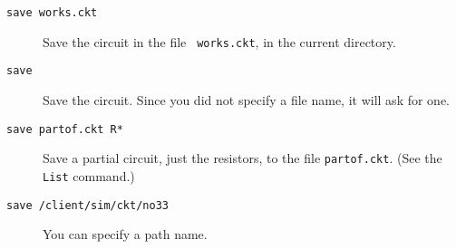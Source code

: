 \begin{description}

\item[{\tt save works.ckt}] Save the circuit in the file {\tt
works.ckt}, in the current directory.

\item[{\tt save}] Save the circuit.  Since you did not specify a file name,
it will ask for one.

\item[{\tt save partof.ckt R*}] Save a partial circuit, just the
resistors, to the file {\tt partof.ckt}.  (See the {\tt List}
command.)


\item[{\tt save /client/sim/ckt/no33}] You can specify a path name.

\end{description}
